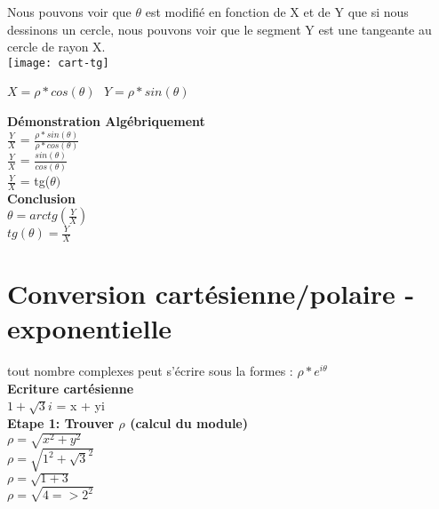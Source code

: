 Nous pouvons voir que $\theta$ est modifié en fonction de X et de Y que si nous dessinons un cercle, nous pouvons voir que le segment Y est une tangeante au cercle de rayon X. \\

\texttt{[image: cart-tg]}

$X=\rho * cos(\theta)$ $ $ $ Y=\rho * sin(\theta)$

\vspace{5mm} %
\textbf{Démonstration Algébriquement} \\

$\frac{Y}{X}$ = $\frac{\rho * sin(\theta)}{\rho * cos(\theta)}$ \\
$\frac{Y}{X}$ = $\frac{sin(\theta)}{cos(\theta)}$ \\
$\frac{Y}{X}$ = tg($\theta)$ \\

\vspace{5mm} %
\textbf{Conclusion} \\

$\theta = arctg(\frac{Y}{X})$ \\
$tg(\theta) = \frac{Y}{X}$ \\

\newpage
\section{Conversion cartésienne/polaire - exponentielle}
\vspace{3mm} %

tout nombre complexes peut s'écrire sous la formes : $\rho * e^{i\theta}$ \\

\textbf{Ecriture cartésienne} \\

$1+\sqrt{3}i$ = x + yi \\

\vspace{5mm}
\textbf{Etape 1: Trouver $\rho$ (calcul du module)} \\

$\rho = \sqrt{x^{2} + y^{2}}$ \\

$\rho = \sqrt{1^{2} + \sqrt{3}^{2}}$ \\

$\rho = \sqrt{1 + 3}$ \\

$\rho = \sqrt{4 => 2^{2}}$ \\

